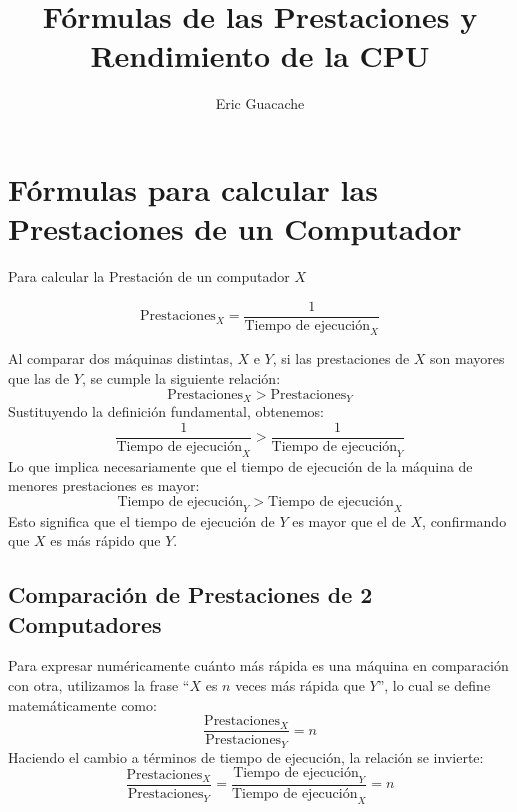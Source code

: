 \documentclass[12pt, a4paper]{article}
\title{\textbf{Fórmulas de las Prestaciones y Rendimiento de la CPU}}
\author{Eric Guacache}
\date{}
\begin{document}
	
	\maketitle
	
	\section{Fórmulas para calcular las Prestaciones de un Computador}
	
	Para calcular la Prestación de un computador $X$
	
	\begin{equation}
		\text{Prestaciones}_X = \frac{1}{\text{Tiempo de ejecución}_X}
	\end{equation}
	
	Al comparar dos máquinas distintas, $X$ e $Y$, si las prestaciones de $X$ son mayores que las de $Y$, se cumple la siguiente relación:
	\begin{equation}
		\text{Prestaciones}_X > \text{Prestaciones}_Y
	\end{equation}
	Sustituyendo la definición fundamental, obtenemos:
	\begin{equation}
		\frac{1}{\text{Tiempo de ejecución}_X} > \frac{1}{\text{Tiempo de ejecución}_Y}
	\end{equation}
	Lo que implica necesariamente que el tiempo de ejecución de la máquina de menores prestaciones es mayor:
	\begin{equation}
		\text{Tiempo de ejecución}_Y > \text{Tiempo de ejecución}_X
	\end{equation}
	Esto significa que el tiempo de ejecución de $Y$ es mayor que el de $X$, confirmando que $X$ es más rápido que $Y$.
	
	\subsection{Comparación de Prestaciones de 2 Computadores}
	Para expresar numéricamente cuánto más rápida es una máquina en comparación con otra, utilizamos la frase ``$X$ es $n$ veces más rápida que $Y$'', lo cual se define matemáticamente como:
	\begin{equation}
		\frac{\text{Prestaciones}_X}{\text{Prestaciones}_Y} = n
	\end{equation}
	Haciendo el cambio a términos de tiempo de ejecución, la relación se invierte:
	\begin{equation}
		\frac{\text{Prestaciones}_X}{\text{Prestaciones}_Y} = \frac{\text{Tiempo de ejecución}_Y}{\text{Tiempo de ejecución}_X} = n
	\end{equation}
	
\end{document}
